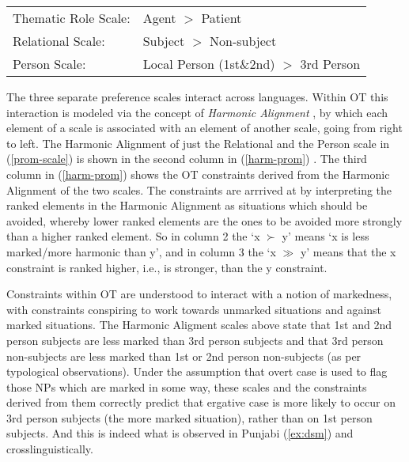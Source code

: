 \documentclass[output=paper,hidelinks]{langscibook}
\begin{document}
\ea \label{prom-scale}
\begin{tabular}[t]{ll}
Thematic Role Scale: & Agent $>$ Patient  \\
Relational Scale: & Subject $>$ Non-subject  \\
Person Scale: & Local Person (1st\&2nd) $>$  3rd Person \\
\end{tabular}
\z
The three separate preference scales interact across languages. Within OT  this
interaction is modeled via the concept of {\em Harmonic Alignment}
\citep{PrinceSmolensky1993}, by which each element of a scale is associated with
an element of another scale, going from right to left.  The Harmonic Alignment
of just the Relational and the Person scale in (\ref{prom-scale}) is shown in
the second column in (\ref{harm-prom}) \citep[681]{Aissen1999}.  The third
column in (\ref{harm-prom}) shows the OT constraints derived from the Harmonic
Alignment of the two scales.  The constraints are arrrived at by interpreting
the ranked elements in the Harmonic Alignment as situations which should be
avoided, whereby lower ranked elements are the ones to be avoided more strongly
than a higher ranked element. So in column 2 
the `x $\succ$ y'
means `x is less marked/more harmonic than  y', and in column 3 the `x $\gg$ y'
means that the x constraint is ranked higher, i.e., is stronger, than
the y constraint.



Constraints within OT are understood to interact with a notion of
markedness, with constraints conspiring to work towards unmarked situations and
against marked situations.  The Harmonic Aligment scales above state that 1st
and 2nd person subjects are less marked than  3rd person subjects and that 
3rd person non-subjects are less marked than 1st or 2nd person
non-subjects (as per typological observations).  Under the assumption that overt
case is used to flag those NPs which are marked in some way, these scales and
the constraints derived from them correctly predict that ergative case is more
likely to occur on 3rd person subjects (the more marked situation), rather than
on 1st person subjects. And this is indeed what is observed in Punjabi
(\ref{ex:dsm}) and crosslinguistically.
\end{document}
